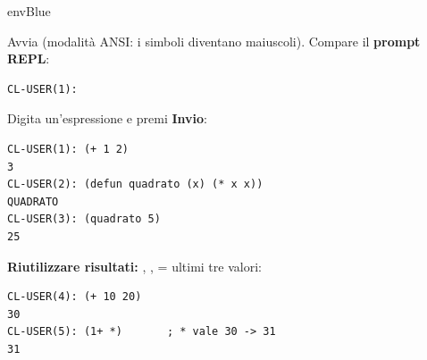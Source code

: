 \begin{envbox}{envBlue}

\small\color{black!70}
Avvia  \color{black!55}(modalità ANSI: i simboli diventano maiuscoli)\color{black!70}.
Compare il \textbf{\textcolor{envBlue!80!black}{prompt REPL}}:\nopagebreak
\color{black}

\begin{lstlisting}
CL-USER(1):
\end{lstlisting}

\small\color{black!70}
Digita un'espressione e premi \textbf{Invio}:\nopagebreak
\color{black}

\begin{lstlisting}
CL-USER(1): (+ 1 2)
3
CL-USER(2): (defun quadrato (x) (* x x))
QUADRATO
CL-USER(3): (quadrato 5)
25
\end{lstlisting}

\small\color{black!70}
\textbf{\textcolor{envBlue!80!black}{Riutilizzare risultati:}} \fn{*}, \fn{**}, \fn{***} = ultimi tre valori:\nopagebreak
\color{black}

\begin{lstlisting}
CL-USER(4): (+ 10 20)
30
CL-USER(5): (1+ *)       ; * vale 30 -> 31
31
\end{lstlisting}

\end{envbox}


